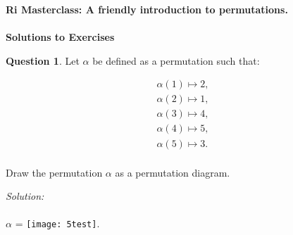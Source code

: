 \documentclass[a4paper,12pt]{article}
\date{Version of \today}
\theoremstyle{definition}
\newtheorem{question}{Question}%
\theoremstyle{remark}
\begin{document}
\renewcommand{\headrulewidth}{0pt}
\fancyhead{}
\fancyfoot{}
\cfoot{}

\begin{center} \textbf{{\large Ri Masterclass: A friendly introduction to permutations. }} \\
{\hspace{1em}} \\
\textbf{Solutions to Exercises}
\end{center}


\begin{question}
 Let $\alpha$ be defined as a permutation such that:

 \begin{align*}
   \label{eq:1}
   \alpha(1) \mapsto 2, \\
   \alpha(2) \mapsto 1, \\
   \alpha(3) \mapsto 4, \\ 
   \alpha(4) \mapsto 5, \\
   \alpha(5) \mapsto 3. \\
 \end{align*}

Draw the permutation $\alpha$ as a permutation diagram.
\end{question}


\textit{Solution:}
\\
\textcolor{white}{.}  \\
$\alpha$ = \texttt{[image: 5test]}.
\end{document}
